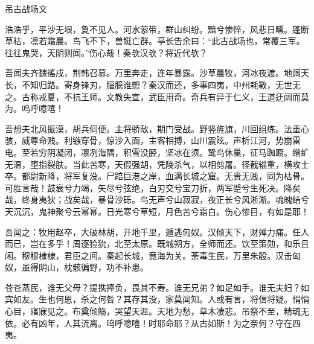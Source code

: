 吊古战场文

浩浩乎，平沙无垠，夐不见人。河水萦带，群山纠纷。黯兮惨悴，风悲日曛。蓬断草枯，凛若霜晨。鸟飞不下，兽铤亡群。亭长告余曰：“此古战场也，常覆三军。往往鬼哭，天阴则闻。”伤心哉！秦欤汉欤？将近代欤？

吾闻夫齐魏徭戍，荆韩召募。万里奔走，连年暴露。沙草晨牧，河冰夜渡。地阔天长，不知归路。寄身锋刃，腷臆谁愬？秦汉而还，多事四夷，中州耗斁，无世无之。古称戎夏，不抗王师。文教失宣，武臣用奇。奇兵有异于仁义，王道迂阔而莫为。呜呼噫嘻！

吾想夫北风振漠，胡兵伺便。主将骄敌，期门受战。野竖旌旗，川回组练。法重心骇，威尊命贱。利镞穿骨，惊沙入面，主客相搏，山川震眩。声析江河，势崩雷电。至若穷阴凝闭，凛冽海隅，积雪没胫，坚冰在须。鸷鸟休巢，征马踟蹰。缯纩无温，堕指裂肤。当此苦寒，天假强胡，凭陵杀气，以相剪屠。径截辎重，横攻士卒。都尉新降，将军复没。尸踣巨港之岸，血满长城之窟。无贵无贱，同为枯骨。可胜言哉！鼓衰兮力竭，矢尽兮弦绝，白刃交兮宝刀折，两军蹙兮生死决。降矣哉，终身夷狄；战矣哉，暴骨沙砾。鸟无声兮山寂寂，夜正长兮风淅淅。魂魄结兮天沉沉，鬼神聚兮云幂幂。日光寒兮草短，月色苦兮霜白。伤心惨目，有如是耶！

吾闻之：牧用赵卒，大破林胡，开地千里，遁逃匈奴。汉倾天下，财殚力痡。任人而已，岂在多乎！周逐猃狁，北至太原。既城朔方，全师而还。饮至策勋，和乐且闲。穆穆棣棣，君臣之间。秦起长城，竟海为关。荼毒生民，万里朱殷。汉击匈奴，虽得阴山，枕骸徧野，功不补患。

苍苍蒸民，谁无父母？提携捧负，畏其不寿。谁无兄弟？如足如手。谁无夫妇？如宾如友。生也何恩，杀之何咎？其存其没，家莫闻知。人或有言，将信将疑。悁悁心目，寤寐见之。布奠倾觞，哭望天涯。天地为愁，草木凄悲。吊祭不至，精魂无依。必有凶年，人其流离。呜呼噫嘻！时耶命耶？从古如斯！为之奈何？守在四夷。